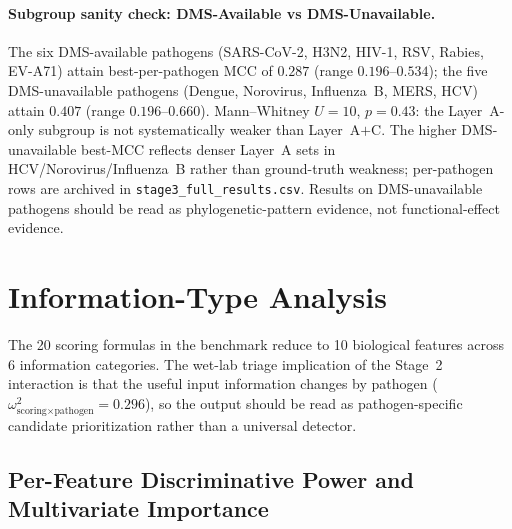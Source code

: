 \paragraph{Subgroup sanity check: DMS-Available vs DMS-Unavailable.}
\label{subsec:dms_subgroup}\label{tab:dms_subgroup}
The six DMS-available pathogens (SARS-CoV-2, H3N2, HIV-1, RSV, Rabies, EV-A71) attain best-per-pathogen MCC of $0.287$ (range $0.196$--$0.534$); the five DMS-unavailable pathogens (Dengue, Norovirus, Influenza~B, MERS, HCV) attain $0.407$ (range $0.196$--$0.660$). Mann--Whitney $U = 10$, $p = 0.43$: the Layer~A-only subgroup is not systematically weaker than Layer~A$+$C. The higher DMS-unavailable best-MCC reflects denser Layer~A sets in HCV/Norovirus/Influenza~B rather than ground-truth weakness; per-pathogen rows are archived in \texttt{stage3\_full\_results.csv}. Results on DMS-unavailable pathogens should be read as phylogenetic-pattern evidence, not functional-effect evidence.

\section{Information-Type Analysis}
\label{sec:information_analysis}
\label{ch:adapt}

The 20 scoring formulas in the benchmark reduce to 10 biological features across 6 information categories. The wet-lab triage implication of the Stage~2 interaction is that the useful input information changes by pathogen ($\omega^2_{\text{scoring}\times\text{pathogen}}=0.296$), so the output should be read as pathogen-specific candidate prioritization rather than a universal detector.

\subsection{Per-Feature Discriminative Power and Multivariate Importance}
\label{subsec:per_feature_auc}\label{subsec:rf_importance}\label{subsec:feature_correlation}\label{subsec:info_type_implications}

